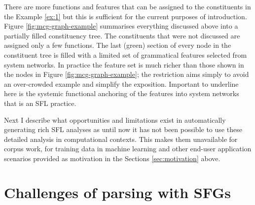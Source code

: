 There are more functions and features that can be assigned to the constituents in the Example \ref{ex:1} but this is sufficient for the current purposes of introduction. Figure \ref{fig:mcg-graph-example} summarises everything discussed above into a partially filled constituency tree. The constituents that were not discussed are assigned only a few functions. %
The last (green) section of every node in the constituent tree is filled with a limited set of grammatical features selected from system networks. In practice the feature set is much richer than those shown in the nodes in Figure \ref{fig:mcg-graph-example}; the restriction aims simply to avoid an over-crowded example and simplify the exposition. Important to underline here is the systemic functional anchoring of the features into system networks that is an SFL practice.


Next I describe what opportunities and limitations exist in automatically generating rich SFL analyses as until now it has not been possible to use these detailed analysis in computational contexts. This makes them unavailable for corpus work, for training data in machine learning and other end-user application scenarios provided as motivation in the Sections \ref{sec:motivation} above.

\section{Challenges of parsing with SFGs}
\label{sec:problem}


